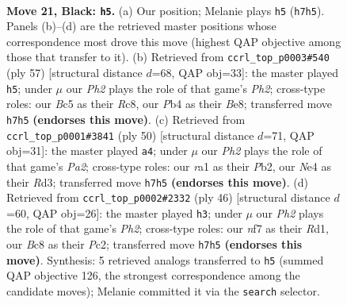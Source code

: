 \documentclass[11pt]{article}
\begin{document}
\clearpage

\begin{figure}[p]\centering
\begin{subfigure}{0.46\textwidth}\centering
\resizebox{\linewidth}{!}{%
\newchessgame
\chessboard[
  setfen={r1b5/2k2N1p/2p1p1p1/P1b5/1p2nP1P/4P3/8/RNB3K1 b - - 0 21},
  showmover=false,
  pgfstyle=straightmove, color=movearrow, markmove={h7-h5}
]}
\caption{}
\end{subfigure}\hfill
\begin{subfigure}{0.46\textwidth}\centering
\resizebox{\linewidth}{!}{%
\newchessgame
\chessboard[
  setfen={2r1b1k1/7p/p4pp1/2Nnp3/PP5P/5P2/3B2P1/2R3K1 b - - 0 29},
  showmover=false,
  pgfstyle=straightmove, color=movearrow, markmove={h7-h5}
]}
\caption{}
\end{subfigure}
\\[4pt]
\begin{subfigure}{0.46\textwidth}\centering
\resizebox{\linewidth}{!}{%
\newchessgame
\chessboard[
  setfen={4r1k1/1pp3b1/3pn1p1/p2N4/8/2PRB1PP/PP3K2/8 w - - 0 26},
  showmover=false,
  pgfstyle=straightmove, color=movearrow, markmove={a2-a4}
]}
\caption{}
\end{subfigure}\hfill
\begin{subfigure}{0.46\textwidth}\centering
\resizebox{\linewidth}{!}{%
\newchessgame
\chessboard[
  setfen={2k2b1r/pp4p1/2n3p1/3N2Pp/4p3/2B5/PPP4P/2KR4 w - - 0 24},
  showmover=false,
  pgfstyle=straightmove, color=movearrow, markmove={h2-h3}
]}
\caption{}
\end{subfigure}
\caption{\textbf{Move 21, Black: \texttt{h5}.} (a) Our position; Melanie plays \texttt{h5} (\texttt{h7h5}). Panels (b)--(d) are the retrieved master positions whose correspondence most drove this move (highest QAP objective among those that transfer to it). (b) Retrieved from \texttt{ccrl\_top\_p0003\#540} (ply 57) [structural distance $d$=68, QAP obj=33]: the master played \texttt{h5}; under $\mu$ our \emph{Ph2} plays the role of that game's \emph{Ph2}; cross-type roles: our \emph{B}c5 as their \emph{R}c8, our \emph{P}b4 as their \emph{B}e8; transferred move \texttt{h7h5} \textbf{(endorses this move)}. (c) Retrieved from \texttt{ccrl\_top\_p0001\#3841} (ply 50) [structural distance $d$=71, QAP obj=31]: the master played \texttt{a4}; under $\mu$ our \emph{Ph2} plays the role of that game's \emph{Pa2}; cross-type roles: our \emph{r}a1 as their \emph{P}b2, our \emph{N}e4 as their \emph{R}d3; transferred move \texttt{h7h5} \textbf{(endorses this move)}. (d) Retrieved from \texttt{ccrl\_top\_p0002\#2332} (ply 46) [structural distance $d$=60, QAP obj=26]: the master played \texttt{h3}; under $\mu$ our \emph{Ph2} plays the role of that game's \emph{Ph2}; cross-type roles: our \emph{n}f7 as their \emph{R}d1, our \emph{B}c8 as their \emph{P}c2; transferred move \texttt{h7h5} \textbf{(endorses this move)}. Synthesis: 5 retrieved analogs transferred to \texttt{h5} (summed QAP objective 126, the strongest correspondence among the candidate moves); Melanie committed it via the \texttt{search} selector.}
\label{fig:thought-m41}
\end{figure}
\end{document}
